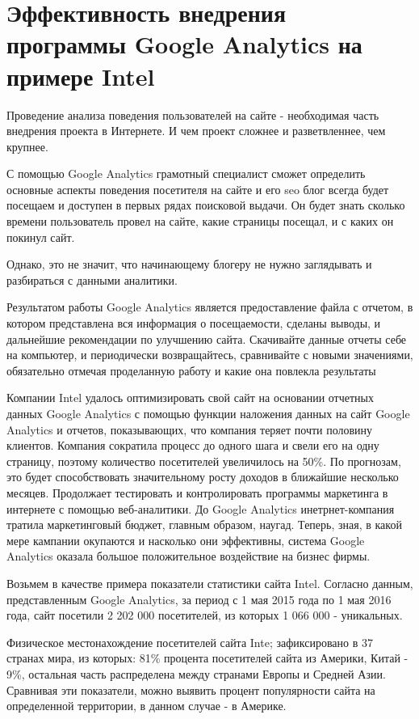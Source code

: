 \documentclass[a4paper,english,russian]{G2-105}
\begin{document}
\section{Эффективность внедрения программы Google Analytics на примере Intel}
\par Проведение анализа поведения пользователей на сайте - необходимая часть внедрения проекта в Интернете. И чем проект сложнее и разветвленнее, чем крупнее.
\par С помощью Google Analytics грамотный специалист сможет определить основные аспекты поведения посетителя на сайте и его seo блог всегда будет посещаем и доступен в первых рядах поисковой выдачи. Он будет знать сколько времени пользователь провел на сайте, какие страницы посещал, и с каких он покинул сайт.
\par Однако, это не значит, что начинающему блогеру не нужно заглядывать и разбираться с данными аналитики.
\par Результатом работы Google Analytics является предоставление файла с отчетом, в котором представлена вся информация о посещаемости, сделаны выводы, и дальнейшие рекомендации по улучшению сайта. Скачивайте данные отчеты себе на компьютер, и периодически возвращайтесь, сравнивайте с новыми значениями, обязательно отмечая проделанную работу и какие она повлекла результаты
\par Компании Intel удалось оптимизировать свой сайт на основании отчетных данных Google Analytics с помощью функции наложения данных на сайт Google Analytics и отчетов, показывающих, что компания теряет почти половину клиентов. Компания сократила процесс до одного шага и свели его на одну страницу, поэтому количество посетителей увеличилось на 50\%. По прогнозам, это будет способствовать значительному росту доходов в ближайшие несколько месяцев. Продолжает тестировать и контролировать программы маркетинга в интернете с помощью веб-аналитики. До Google Analytics инетрнет-компания тратила маркетинговый бюджет, главным образом, наугад. Теперь, зная, в какой мере кампании окупаются и насколько они эффективны, система Google Analytics оказала большое положительное воздействие на бизнес фирмы.
\par Возьмем в качестве примера показатели статистики сайта Intel. Согласно данным, представленным Google Analytics, за период с 1 мая 2015 года по 1 мая 2016 года, сайт посетили 2 202 000 посетителей, из которых 1 066 000 - уникальных.
\par Физическое местонахождение посетителей сайта Inte; зафиксировано в 37 странах мира, из которых: 81\% процента посетителей сайта из Америки, Китай - 9\%, остальная часть распределена между странами Европы и Средней Азии. Сравнивая эти показатели, можно выявить процент популярности сайта на определенной территории, в данном случае - в Америке.
\end{document}
